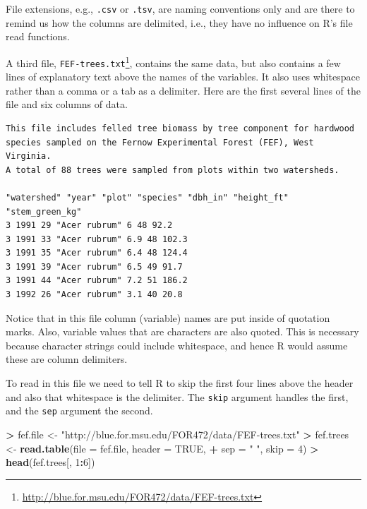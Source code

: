 \documentclass[]{krantz}
\makeatletter
\newenvironment{Shaded}{\begin{snugshade}}{\end{snugshade}}
\newcommand{\DataTypeTok}[1]{\textcolor[rgb]{0.27,0.27,0.27}{#1}}
\newcommand{\DecValTok}[1]{\textcolor[rgb]{0.06,0.06,0.06}{#1}}
\newcommand{\KeywordTok}[1]{\textcolor[rgb]{0.27,0.27,0.27}{\textbf{#1}}}
\newcommand{\NormalTok}[1]{#1}
\newcommand{\OperatorTok}[1]{\textcolor[rgb]{0.43,0.43,0.43}{\textbf{#1}}}
\newcommand{\OtherTok}[1]{\textcolor[rgb]{0.37,0.37,0.37}{#1}}
\newcommand{\StringTok}[1]{\textcolor[rgb]{0.5,0.5,0.5}{#1}}
\renewcommand{\href}[2]{#2\footnote{\url{#1}}}
\newenvironment{kframe}{%
\medskip{}
\setlength{\fboxsep}{.8em}
 \def\at@end@of@kframe{}%
 \ifinner\ifhmode%
  \def\at@end@of@kframe{\end{minipage}}%
  \begin{minipage}{\columnwidth}%
 \fi\fi%
 \def\FrameCommand##1{\hskip\@totalleftmargin \hskip-\fboxsep
 \colorbox{shadecolor}{##1}\hskip-\fboxsep
     \hskip-\linewidth \hskip-\@totalleftmargin \hskip\columnwidth}%
 \MakeFramed {\advance\hsize-\width
   \@totalleftmargin\z@ \linewidth\hsize
   \@setminipage}}%
 {\par\unskip\endMakeFramed%
 \at@end@of@kframe}
\renewenvironment{Shaded}{\begin{kframe}}{\end{kframe}}
\makeatother
\begin{document}
File extensions, e.g., \texttt{.csv} or \texttt{.tsv}, are naming conventions only and are there to remind us how the columns are delimited, i.e., they have no influence on R's file read functions.

A third file, \href{http://blue.for.msu.edu/FOR472/data/FEF-trees.txt}{\texttt{FEF-trees.txt}}, contains the same data, but also contains a few lines of explanatory text above the names of the variables. It also uses whitespace rather than a comma or a tab as a delimiter. Here are the first several lines of the file and six columns of data.

\begin{verbatim}
This file includes felled tree biomass by tree component for hardwood 
species sampled on the Fernow Experimental Forest (FEF), West Virginia. 
A total of 88 trees were sampled from plots within two watersheds. 

"watershed" "year" "plot" "species" "dbh_in" "height_ft" "stem_green_kg"
3 1991 29 "Acer rubrum" 6 48 92.2
3 1991 33 "Acer rubrum" 6.9 48 102.3
3 1991 35 "Acer rubrum" 6.4 48 124.4
3 1991 39 "Acer rubrum" 6.5 49 91.7
3 1991 44 "Acer rubrum" 7.2 51 186.2
3 1992 26 "Acer rubrum" 3.1 40 20.8
\end{verbatim}

Notice that in this file column (variable) names are put inside of quotation marks. Also, variable values that are characters are also quoted. This is necessary because character strings could include whitespace, and hence R would assume these are column delimiters.

To read in this file we need to tell R to skip the first four lines above the header and also that whitespace is the delimiter. The \texttt{skip} argument handles the first, and the \texttt{sep} argument the second.

\begin{Shaded}
\begin{Highlighting}[]
\OperatorTok{>}\StringTok{ }\NormalTok{fef.file <-}\StringTok{ "http://blue.for.msu.edu/FOR472/data/FEF-trees.txt"}
\OperatorTok{>}\StringTok{ }\NormalTok{fef.trees <-}\StringTok{ }\KeywordTok{read.table}\NormalTok{(}\DataTypeTok{file =}\NormalTok{ fef.file, }\DataTypeTok{header =} \OtherTok{TRUE}\NormalTok{, }
\OperatorTok{+}\StringTok{   }\DataTypeTok{sep =} \StringTok{" "}\NormalTok{, }\DataTypeTok{skip =} \DecValTok{4}\NormalTok{)}
\OperatorTok{>}\StringTok{ }\KeywordTok{head}\NormalTok{(fef.trees[, }\DecValTok{1}\OperatorTok{:}\DecValTok{6}\NormalTok{])}
\end{Highlighting}
\end{Shaded}
\end{document}
